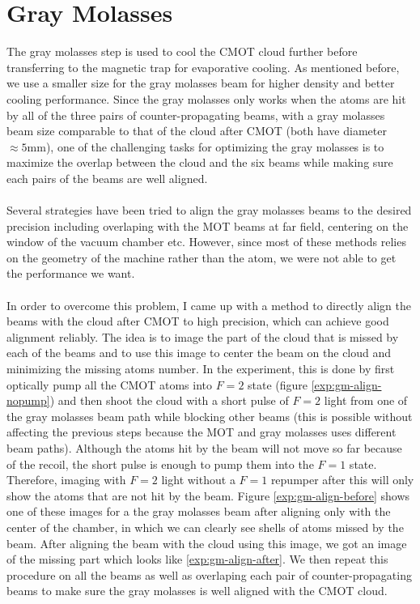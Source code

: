 \section{Gray Molasses}\label{exp:gm}
The gray molasses step is used to cool the CMOT cloud further before transferring to the magnetic trap for evaporative cooling. As mentioned before, we use a smaller size for the gray molasses beam for higher density and better cooling performance. Since the gray molasses only works when the atoms are hit by all of the three pairs of counter-propagating beams, with a gray molasses beam size comparable to that of the cloud after CMOT (both have diameter $\approx5\text{mm}$), one of the challenging tasks for optimizing the gray molasses is to maximize the overlap between the cloud and the six beams while making sure each pairs of the beams are well aligned.\\
\\
Several strategies have been tried to align the gray molasses beams to the desired precision including overlaping with the MOT beams at far field, centering on the window of the vacuum chamber etc. However, since most of these methods relies on the geometry of the machine rather than the atom, we were not able to get the performance we want.\\
\\
In order to overcome this problem, I came up with a method to directly align the beams with the cloud after CMOT to high precision, which can achieve good alignment reliably. The idea is to image the part of the cloud that is missed by each of the beams and to use this image to center the beam on the cloud and minimizing the missing atoms number. In the experiment, this is done by first optically pump all the CMOT atoms into $F=2$ state (figure \ref{exp:gm-align-nopump}) and then shoot the cloud with a short pulse of $F=2$ light from one of the gray molasses beam path while blocking other beams (this is possible without affecting the previous steps because the MOT and gray molasses uses different beam paths). Although the atoms hit by the beam will not move so far because of the recoil, the short pulse is enough to pump them into the $F=1$ state. Therefore, imaging with $F=2$ light without a $F=1$ repumper after this will only show the atoms that are not hit by the beam. Figure \ref{exp:gm-align-before} shows one of these images for a the gray molasses beam after aligning only with the center of the chamber, in which we can clearly see shells of atoms missed by the beam. After aligning the beam with the cloud using this image, we got an image of the missing part which looks like \ref{exp:gm-align-after}. We then repeat this procedure on all the beams as well as overlaping each pair of counter-propagating beams to make sure the gray molasses is well aligned with the CMOT cloud.\\
